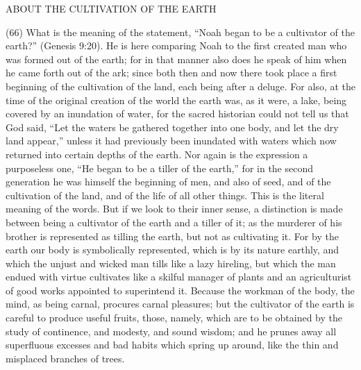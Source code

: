 ABOUT THE CULTIVATION OF THE EARTH

(66) What is the meaning of the statement, ``Noah began to be a cultivator of the earth?'' (Genesis
9:20). He is here comparing Noah to the first created man who was formed out of the earth; for in
that manner also does he speak of him when he came forth out of the ark; since both then and now
there took place a first beginning of the cultivation of the land, each being after a deluge. For also,
at the time of the original creation of the world the earth was, as it were, a lake, being covered by
an inundation of water, for the sacred historian could not tell us that God said, ``Let the waters be
gathered together into one body, and let the dry land appear,'' unless it had previously been
inundated with waters which now returned into certain depths of the earth. Nor again is the
expression a purposeless one, ``He began to be a tiller of the earth,'' for in the second generation
he was himself the beginning of men, and also of seed, and of the cultivation of the land, and of the
life of all other things. This is the literal meaning of the words. But if we look to their inner sense, a
distinction is made between being a cultivator of the earth and a tiller of it; as the murderer of his
brother is represented as tilling the earth, but not as cultivating it. For by the earth our body is
symbolically represented, which is by its nature earthly, and which the unjust and wicked man tills
like a lazy hireling, but which the man endued with virtue cultivates like a skilful manager of plants
and an agriculturist of good works appointed to superintend it. Because the workman of the body,
the mind, as being carnal, procures carnal pleasures; but the cultivator of the earth is careful to
produce useful fruits, those, namely, which are to be obtained by the study of continence, and
modesty, and sound wisdom; and he prunes away all superfluous excesses and bad habits which
spring up around, like the thin and misplaced branches of trees.

